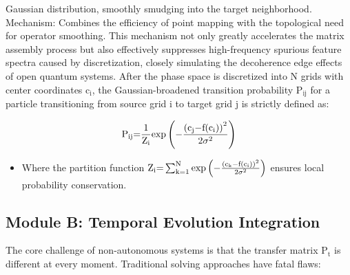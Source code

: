 \documentclass[fleqn,10pt]{wlscirep}
\begin{document}
\begin{itemize}
  Gaussian distribution, smoothly smudging into the target neighborhood.
  Mechanism: Combines the efficiency of point mapping with the
  topological need for operator smoothing. This mechanism not only
  greatly accelerates the matrix assembly process but also effectively
  suppresses high-frequency spurious feature spectra caused by
  discretization, closely simulating the decoherence edge effects of
  open quantum systems. After the phase space is discretized into
  \(\text{N}\) grids with center coordinates \(\text{c}_{\text{i}}\),
  the Gaussian-broadened transition probability \(\text{P}_{\text{ij}}\)
  for a particle transitioning from source grid \(\text{i}\) to target
  grid \(\text{j}\) is strictly defined as:
\end{itemize}

\[\text{P}_{\text{ij}}\text{=}\frac{\text{1}}{\text{Z}_{\text{i}}}\text{exp}\left( \text{\ensuremath{-}}\frac{\text{(}\text{c}_{\text{j}}\text{\ensuremath{-}}\text{f}\text{(}\text{c}_{\text{i}}\text{)}\text{)}^{\text{2}}}{\text{2}\text{\ensuremath{\sigma}}^{\text{2}}} \right)\]

\begin{itemize}
\item
  Where the partition function
  \(\text{Z}_{\text{i}}\text{=}\sum_{\text{k}\text{=1}}^{\text{N}}\text{exp}\left( \text{\ensuremath{-}}\frac{\text{(}\text{c}_{\text{k}}\text{\ensuremath{-}}\text{f}\text{(}\text{c}_{\text{i}}\text{)}\text{)}^{\text{2}}}{\text{2}\text{\ensuremath{\sigma}}^{\text{2}}} \right)\)
  ensures local probability conservation.
\end{itemize}

\subsection*{Module B: Temporal Evolution Integration}

The core challenge of non-autonomous systems is that the transfer matrix
\(\text{P}_{\text{t}}\) is different at every moment. Traditional
solving approaches have fatal flaws:
\end{document}
